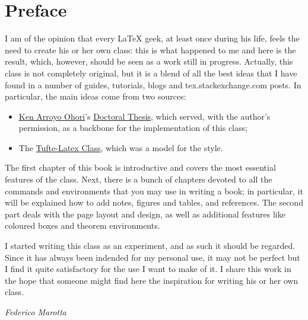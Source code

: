 \chapter*{Preface}

I am of the opinion that every \LaTeX\xspace geek, at least once during 
his life, feels the need to create his or her own class: this is what 
happened to me and here is the result, which, however, should be seen as 
a work still in progress. Actually, this class is not completely 
original, but it is a blend of all the best ideas that I have found in a 
number of guides, tutorials, blogs and tex.stackexchange.com posts. In 
particular, the main ideas come from two sources:

\begin{itemize}
	\item \href{https://3d.bk.tudelft.nl/ken/en/}{Ken Arroyo Ohori}'s 
	\href{https://3d.bk.tudelft.nl/ken/en/nl/ken/en/2016/04/17/a-1.5-column-layout-in-latex.html}{Doctoral 
	Thesis}, which served, with the author's permission, as a backbone 
	for the implementation of this class;
	\item The 
		\href{https://github.com/Tufte-LaTeX/tufte-latex}{Tufte-Latex 
			Class}, which was a model for the style.
\end{itemize}

The first chapter of this book is introductive and covers the most 
essential features of the class. Next, there is a bunch of chapters 
devoted to all the commands and environments that you may use in writing 
a book; in particular, it will be explained how to add notes, figures 
and tables, and references. The second part deals with the page layout 
and design, as well as additional features like coloured boxes and 
theorem environments.

I started writing this class as an experiment, and as such it should be 
regarded. Since it has always been indended for my personal use, it may 
not be perfect but I find it quite satisfactory for the use I want to 
make of it. I share this work in the hope that someone might find here 
the inspiration for writing his or her own class.

\begin{flushright}
	\textit{Federico Marotta}
\end{flushright}
